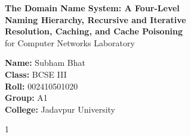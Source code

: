 \documentclass[11pt,a4paper]{article}
\begin{document}
\begin{titlepage}
    \centering
    \vspace*{4.2cm}

    {\LARGE \textbf{The Domain Name System: A Four-Level}}\\[0.7em]
    {\LARGE \textbf{Naming Hierarchy, Recursive and Iterative}}\\[0.7em]
    {\LARGE \textbf{Resolution, Caching, and Cache Poisoning}}\\[1.4em]

    {\large for Computer Networks Laboratory}

    \vspace{3.8cm}

    {\large
    \textbf{Name:} Subham Bhat\\[0.55em]
    \textbf{Class:} BCSE III\\[0.55em]
    \textbf{Roll:} 002410501020\\[0.55em]
    \textbf{Group:} A1\\[0.55em]
    \textbf{College:} Jadavpur University
    }

    \vfill
    {\normalsize 1}
\end{titlepage}

\setcounter{page}{2}
\tableofcontents
\newpage

\setcounter{page}{3}
\end{document}
